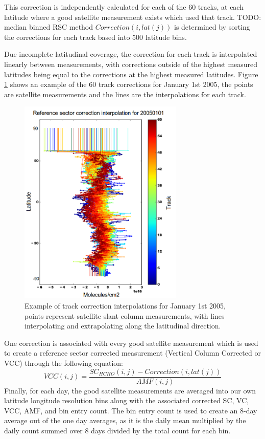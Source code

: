     This correction is independently calculated for each of the 60 tracks, at each latitude where a good satellite measurement exists which used that track.
    TODO: median binned RSC method $Correction(i,lat(j))$ is determined by sorting the corrections for each track based into 500 latitude bins. 
    
    Due incomplete latitudinal coverage, the correction for each track is interpolated linearly between measurements, with corrections outside of the highest measured latitudes being equal to the corrections at the highest measured latitudes.
    Figure \ref{ch_isop:fig:track_correction_interpolations} shows an example of the 60 track corrections for January 1st 2005, the points are satellite measurements and the lines are the interpolations for each track.
    \begin{figure}[!htbp]\begin{center}
      \includegraphics[width=0.7\textwidth]{Figures/HCHO/track_corrections20050101.png}
      \caption{Example of track correction interpolations for January 1st 2005, points represent satellite slant column measurements, with lines interpolating and extrapolating along the latitudinal direction.}
      \label{ch_isop:fig:track_correction_interpolations}
    \end{center}\end{figure}
    
    One correction is associated with every good satellite measurement which is used to create a reference sector corrected measurement (Vertical Column Corrected or VCC) through the following equation:
    \begin{equation}
      VCC(i,j) = \frac{SC_{HCHO}(i,j) - Correction(i,lat(j))}{AMF(i,j)}
    \end{equation}
    Finally, for each day, the good satellite measurements are averaged into our own latitude longitude resolution bins along with the associated corrected SC, VC, VCC, AMF, and bin entry count.
    The bin entry count is used to create an 8-day average out of the one day averages, as it is the daily mean multiplied by the daily count summed over 8 days divided by the total count for each bin.
  
